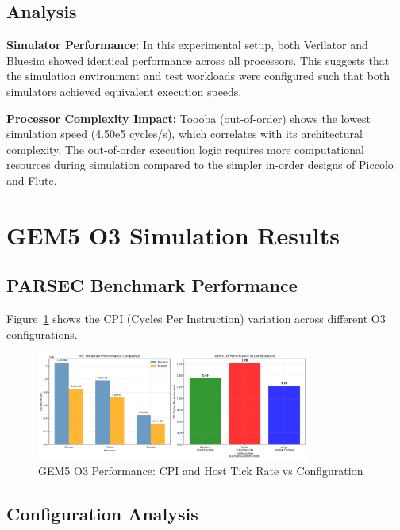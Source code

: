\documentclass[11pt]{article}
\begin{document}
\subsection{Analysis}

\textbf{Simulator Performance:} In this experimental setup, both Verilator and Bluesim showed identical performance across all processors. This suggests that the simulation environment and test workloads were configured such that both simulators achieved equivalent execution speeds.

\textbf{Processor Complexity Impact:} Toooba (out-of-order) shows the lowest simulation speed (4.50e5 cycles/s), which correlates with its architectural complexity. The out-of-order execution logic requires more computational resources during simulation compared to the simpler in-order designs of Piccolo and Flute.

\section{GEM5 O3 Simulation Results}

\subsection{PARSEC Benchmark Performance}

Figure~\ref{fig:gem5_cpi} shows the CPI (Cycles Per Instruction) variation across different O3 configurations.

\begin{figure}[h]
\centering
\includegraphics[width=0.8\textwidth]{gem5_performance_comparison.png}
\caption{GEM5 O3 Performance: CPI and Host Tick Rate vs Configuration}
\label{fig:gem5_cpi}
\end{figure}

\subsection{Configuration Analysis}
\end{document}
